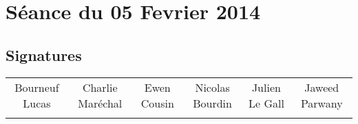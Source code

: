 
\newcommand{\titre}{Compte-rendu de séance}













\chapter*{Séance du 05 Fevrier 2014}
    	\paragraph*{}
	\begin{description}
	\end{description}


\section*{Signatures}

    	\begin{tabular*}{0.75\textwidth}{c | c | c | c | c | c}
    	    Bourneuf Lucas & Charlie Maréchal & Ewen Cousin & Nicolas Bourdin & Julien Le Gall & Jaweed Parwany\\
     	     & & & & &
    	\end{tabular*}





